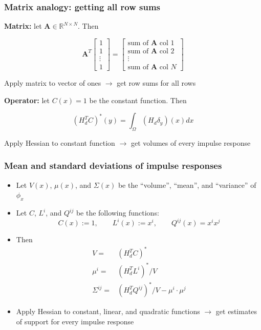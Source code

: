 \documentclass[10pt,final,xcolor=dvipsnames]{beamer}
\begin{document}
\begin{frame}
	\frametitle{Matrix analogy: getting all row sums}
	
\textbf{Matrix:} let $\mathbf{A} \in \mathbb{R}^{N \times N}$. Then
	
	$$\mathbf{A}^T \begin{bmatrix}
	1 \\ 1 \\ \vdots \\ 1
	\end{bmatrix} = \begin{bmatrix}
	\text{sum of }\mathbf{A} \text{ col }1 \\
	\text{sum of }\mathbf{A} \text{ col }2 \\
	\vdots \\
	\text{sum of }\mathbf{A} \text{ col }N
	\end{bmatrix}$$

Apply matrix to vector of ones $\rightarrow$ get row sums for all rows

\vspace{3em}

\textbf{Operator:} let $C(x)=1$ be the constant function. Then 

	$$(H_d^T C)^*(y) = \int_\Omega \left(H_d \delta_y\right)(x) dx$$
	

Apply Hessian to constant function $\rightarrow$ get volumes of every impulse response
\end{frame}
\begin{frame}
	\frametitle{Mean and standard deviations of impulse responses}
	\begin{itemize}
		\setlength\itemsep{2em}
		\item Let $V(x)$, $\mu(x)$, and $\Sigma(x)$ be the ``volume'', ``mean'', and ``variance'' of $\phi_x$
		\item Let $C$, $L^i$, and $Q^{ij}$ be the following functions:
		\begin{equation*}
		C(x) := 1, \qquad
		L^i(x) := x^i, \qquad
		Q^{ij}(x) = x^i x^j
		\end{equation*}
		\item Then
		\begin{align*}
		V =& \left(H_d^T C\right)^* \\
		\mu^i =& \left(H_d^T L^i\right)^* / V \\
		\Sigma^{ij} =& \left(H_d^T Q^{ij}\right)^* / V - \mu^i\cdot \mu^j
		\end{align*}
		\item Apply Hessian to constant, linear, and quadratic functions $\rightarrow$ get estimates of support for every impulse response
	\end{itemize}
	
\end{frame}
\end{document}
